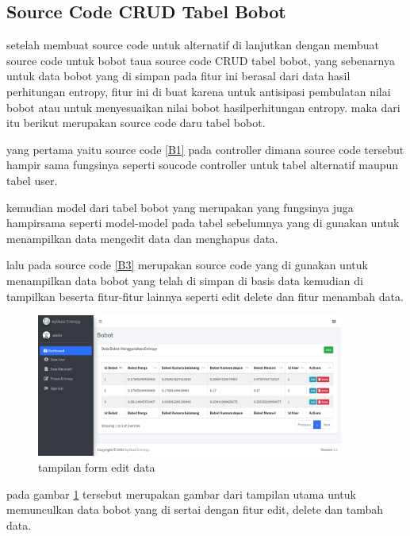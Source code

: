 \subsection{Source Code CRUD Tabel Bobot}
	setelah membuat source code untuk alternatif di lanjutkan dengan membuat source code untuk bobot taua source code CRUD tabel bobot, yang sebenarnya untuk data bobot yang di simpan pada fitur ini berasal dari data hasil perhitungan entropy, fitur ini di buat karena untuk antisipasi pembulatan nilai bobot atau untuk menyesuaikan nilai bobot hasilperhitungan entropy. maka dari itu berikut merupakan source code daru tabel bobot.

yang pertama yaitu source code \ref{B1}  pada controller dimana source code tersebut hampir sama fungsinya seperti soucode controller untuk tabel alternatif maupun tabel user.

kemudian model dari tabel bobot yang merupakan yang fungsinya juga hampirsama seperti model-model pada tabel sebelumnya yang di gunakan untuk menampilkan data mengedit data dan menghapus data.

lalu pada source code \ref{B3} merupakan source code yang di gunakan untuk menampilkan data bobot yang telah di simpan di basis data kemudian di tampilkan beserta fitur-fitur lainnya seperti edit delete dan fitur menambah data.
\begin{figure}[!htbp]
	\centerline{\includegraphics[width=0.90\textwidth]{figures/bo/idx.png}}
	\caption{tampilan form edit data}
	\label{ve17}
\end{figure}
pada gambar \ref{ve17} tersebut merupakan gambar dari tampilan utama untuk memunculkan data bobot yang di sertai dengan fitur edit, delete dan tambah data.




